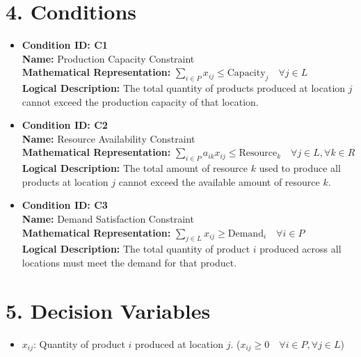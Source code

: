 \documentclass{article}
\begin{document}
\section{4. Conditions}
\begin{itemize}
    \item \textbf{Condition ID: C1} \\
      \textbf{Name:} Production Capacity Constraint \\
      \textbf{Mathematical Representation:} $\sum_{i \in P} x_{ij} \leq \text{Capacity}_{j} \quad \forall j \in L$ \\
      \textbf{Logical Description:} The total quantity of products produced at location $j$ cannot exceed the production capacity of that location.
    \item \textbf{Condition ID: C2} \\
      \textbf{Name:} Resource Availability Constraint \\
      \textbf{Mathematical Representation:} $\sum_{i \in P} a_{ik} x_{ij} \leq \text{Resource}_{k} \quad \forall j \in L, \forall k \in R$ \\
      \textbf{Logical Description:} The total amount of resource $k$ used to produce all products at location $j$ cannot exceed the available amount of resource $k$.
    \item \textbf{Condition ID: C3} \\
      \textbf{Name:} Demand Satisfaction Constraint \\
      \textbf{Mathematical Representation:} $\sum_{j \in L} x_{ij} \geq \text{Demand}_{i} \quad \forall i \in P$ \\
      \textbf{Logical Description:} The total quantity of product $i$ produced across all locations must meet the demand for that product.
\end{itemize}

\section{5. Decision Variables}
\begin{itemize}
    \item $x_{ij}$: Quantity of product $i$ produced at location $j$. ($x_{ij} \geq 0 \quad \forall i \in P, \forall j \in L$)
\end{itemize}
\end{document}
